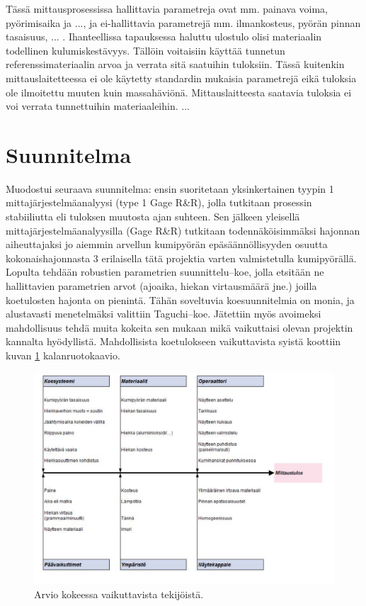 \documentclass[12pt,a4paper,finnish]{tutthesis}
\begin{document}
Tässä mittausprosessissa hallittavia parametreja ovat mm. painava
voima, pyörimisaika ja ..., ja ei-hallittavia parametrejä mm.
ilmankosteus, pyörän pinnan tasaisuus, ... . Ihanteellissa tapauksessa
haluttu ulostulo olisi materiaalin todellinen kulumiskestävyys.
Tällöin voitaisiin käyttää tunnetun referenssimateriaalin arvoa ja
verrata sitä saatuihin tuloksiin.
Tässä kuitenkin mittauslaitetteessa ei ole käytetty standardin mukaisia
parametrejä eikä tuloksia ole ilmoitettu muuten kuin massahäviönä.
Mittauslaitteesta saatavia tuloksia ei voi verrata tunnettuihin
materiaaleihin. ...

\section{Suunnitelma}

Muodostui seuraava suunnitelma: ensin suoritetaan yksinkertainen
tyypin 1 mittajärjestelmäanalyysi (type 1 Gage R\&R), jolla tutkitaan
prosessin stabiiliutta eli tuloksen muutosta ajan suhteen. Sen
jälkeen yleisellä mittajärjestelmäanalyysilla (Gage R\&R) tutkitaan
todennäköisimmäksi hajonnan aiheuttajaksi jo aiemmin arvellun kumipyörän
epäsäännöllisyyden osuutta kokonaishajonnasta 3 erilaisella tätä
projektia varten valmistetulla kumipyörällä. Lopulta tehdään
robustien parametrien suunnittelu–koe, jolla etsitään ne
hallittavien parametrien arvot (ajoaika, hiekan virtausmäärä jne.)
joilla koetulosten hajonta on pienintä. Tähän soveltuvia
koesuunnitelmia on monia, ja alustavasti menetelmäksi valittiin
Taguchi–koe. Jätettiin myös avoimeksi mahdollisuus tehdä muita
kokeita sen mukaan mikä vaikuttaisi olevan projektin kannalta
hyödyllistä. Mahdollisista koetulokseen vaikuttavista syistä koottiin
kuvan \ref{fig:ruoto1} kalanruotokaavio.

\begin{figure}
  \begin{center}
    \includegraphics[width=1.0\textwidth]{Capture7}
  \end{center}
  \caption[Kalanruotokaavio abraasiokokeesta]{Arvio kokeessa vaikuttavista tekijöistä.}
  \label{fig:ruoto1}
\end{figure}
\end{document}
